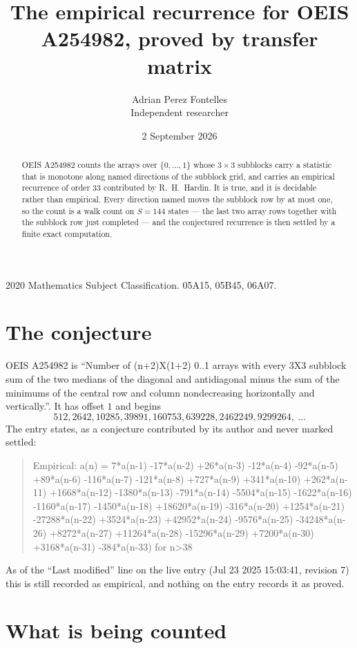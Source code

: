 \documentclass[11pt,a4paper]{article}
\title{The empirical recurrence for OEIS A254982, proved by transfer matrix}
\author{Adrian Perez Fontelles\\ \small Independent researcher}
\date{2 September 2026}
\theoremstyle{plain}
\theoremstyle{definition}
\begin{document}
\maketitle

\begin{abstract}
OEIS A254982 counts the arrays over $\{0,\dots,1\}$ whose $3\times3$ subblocks carry a
statistic that is monotone along named directions of the subblock grid, and carries an
empirical recurrence of order $33$ contributed by R.~H.~Hardin. It is true, and it is
decidable rather than empirical. Every direction named moves the subblock row by at most one,
so the count is a walk count on $S=144$ states --- the last two array rows together with the
subblock row just completed --- and the conjectured recurrence is then settled by a finite
exact computation.
\end{abstract}

\noindent\small 2020 Mathematics Subject Classification. 05A15, 05B45, 06A07.\normalsize

\section{The conjecture}

OEIS A254982 is ``Number of (n+2)X(1+2) 0..1 arrays with every 3X3 subblock sum of the two medians of the diagonal and antidiagonal minus the sum of the minimums of the central row and column nondecreasing horizontally and vertically.''. It has offset $1$ and begins
\[
512, 2642, 10285, 39891, 160753, 639228, 2462249, 9299264,\ \dots
\]
The entry states, as a conjecture contributed by its author and never marked settled:
\begin{quote}
Empirical: a(n) = 7*a(n-1) -17*a(n-2) +26*a(n-3) -12*a(n-4) -92*a(n-5) +89*a(n-6) -116*a(n-7) -121*a(n-8) +727*a(n-9) +341*a(n-10) +262*a(n-11) +1668*a(n-12) -1380*a(n-13) -791*a(n-14) -5504*a(n-15) -1622*a(n-16) -1160*a(n-17) -1450*a(n-18) +18620*a(n-19) -316*a(n-20) +1254*a(n-21) -27288*a(n-22) +3524*a(n-23) +42952*a(n-24) -9576*a(n-25) -34248*a(n-26) +8272*a(n-27) +11264*a(n-28) -15296*a(n-29) +7200*a(n-30) +3168*a(n-31) -384*a(n-33) for n>38
\end{quote}
As of the ``Last modified'' line on the live entry (Jul 23 2025 15:03:41, revision 7) this is still
recorded as empirical, and nothing on the entry records it as proved.

\section{What is being counted}
\end{document}
